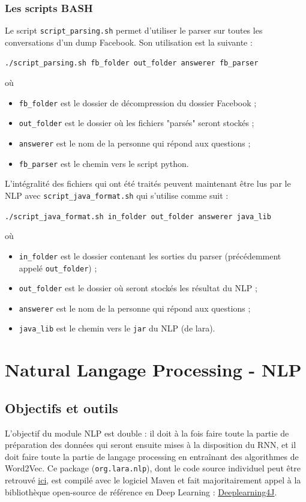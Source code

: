 \documentclass[10pt,a4paper]{article}
\begin{document}
\subsubsection{Les scripts BASH}
Le script \texttt{script\_parsing.sh} permet d'utiliser le parser sur toutes les conversations d'un dump Facebook. Son utilisation est la suivante :
\begin{center}
	\texttt{./script\_parsing.sh fb\_folder out\_folder answerer fb\_parser}
\end{center}
où
\begin{itemize}
	\item \texttt{fb\_folder} est le dossier de décompression du dossier Facebook ;
	\item \texttt{out\_folder} est le dossier où les fichiers "parsés" seront stockés ;
	\item \texttt{answerer} est le nom de la personne qui répond aux questions ;
	\item \texttt{fb\_parser} est le chemin vers le script python.
\end{itemize}
L'intégralité des fichiers qui ont été traités peuvent maintenant être lus par le NLP avec \texttt{script\_java\_format.sh} qui s'utilise comme suit :
\begin{center}
	\texttt{./script\_java\_format.sh in\_folder out\_folder answerer java\_lib}
\end{center}
où
\begin{itemize}
	\item \texttt{in\_folder} est le dossier contenant les sorties du parser (précédemment appelé \texttt{out\_folder}) ;
	\item \texttt{out\_folder} est le dossier où seront stockés les résultat du NLP ;
	\item \texttt{answerer} est le nom de la personne qui répond aux questions ;
	\item \texttt{java\_lib} est le chemin vers le \texttt{jar} du NLP (de lara).
\end{itemize}

\section{Natural Langage Processing - NLP}
\subsection{Objectifs et outils}
L'objectif du module NLP est double : il doit à la fois faire toute la partie de préparation des données qui seront ensuite mises à la disposition du RNN, et il doit faire toute la partie de langage processing en entraînant des algorithmes de Word2Vec. Ce package (\texttt{org.lara.nlp}), dont le code source individuel peut être retrouvé \href{https://github.com/LaraProject/nlp}{ici}, est compilé avec le logiciel Maven et fait majoritairement appel à la bibliothèque open-source de référence en Deep Learning : \href{https://deeplearning4j.konduit.ai/}{Deeplearning4J}.
\end{document}
